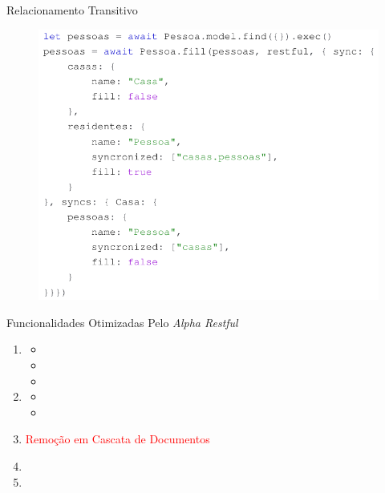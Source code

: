 \documentclass{beamer} %
\begin{document}
\begin{frame}{Relacionamento Transitivo}
    \begin{figure}
        \centering
        \includegraphics[width=0.88\linewidth]{imagens/relacionamento-inverso-do-relacionamento-inverso-alpha-restful.png}
        \label{fig:relacionamento-inverso-do-relacionamento-inverso-alpha-restful}
    \end{figure}
\end{frame}

\begin{frame}{Funcionalidades Otimizadas Pelo \textit{Alpha Restful}}
    \begin{enumerate}
        \item {}
            \begin{itemize}
                \item {}
                \item {}
                \item {}
            \end{itemize}
        \item {}
            \begin{itemize}
                \item {}
                \item {}
            \end{itemize}
        \item \textcolor{red}{Remoção em Cascata de Documentos}
        \item {}
        \item {}
    \end{enumerate}
\end{frame}
\end{document}
